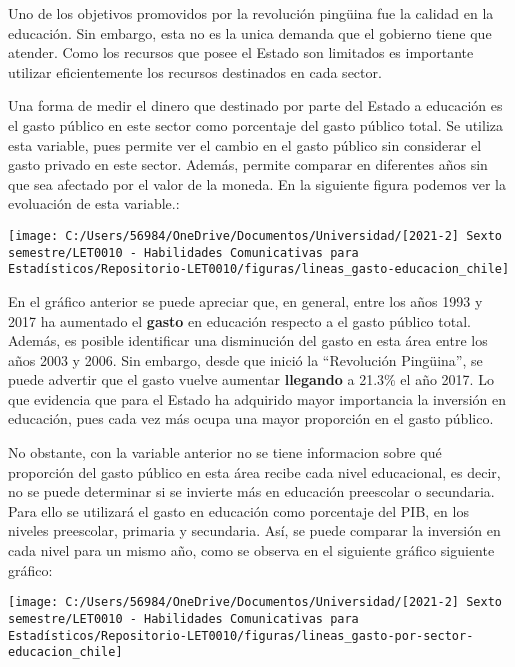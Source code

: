 \documentclass[
]{article}
\begin{document}
Uno de los objetivos promovidos por la revolución pingüina fue la
calidad en la educación. Sin embargo, esta no es la unica demanda que el
gobierno tiene que atender. Como los recursos que posee el Estado son
limitados es importante utilizar eficientemente los recursos destinados
en cada sector.

Una forma de medir el dinero que destinado por parte del Estado a
educación es el gasto público en este sector como porcentaje del gasto
público total. Se utiliza esta variable, pues permite ver el cambio en
el gasto público sin considerar el gasto privado en este sector. Además,
permite comparar en diferentes años sin que sea afectado por el valor de
la moneda. En la siguiente figura podemos ver la evoluación de esta
variable.:

\begin{center}\texttt{[image: C:/Users/56984/OneDrive/Documentos/Universidad/[2021-2] Sexto semestre/LET0010 - Habilidades Comunicativas para Estadísticos/Repositorio-LET0010/figuras/lineas\_gasto-educacion\_chile]} \end{center}

En el gráfico anterior se puede apreciar que, en general, entre los años
1993 y 2017 ha aumentado el \textbf{gasto} en educación respecto a el
gasto público total. Además, es posible identificar una disminución del
gasto en esta área entre los años 2003 y 2006. Sin embargo, desde que
inició la ``Revolución Pingüina'', se puede advertir que el gasto vuelve
aumentar \textbf{llegando} a 21.3\% el año 2017. Lo que evidencia que
para el Estado ha adquirido mayor importancia la inversión en educación,
pues cada vez más ocupa una mayor proporción en el gasto público.

No obstante, con la variable anterior no se tiene informacion sobre qué
proporción del gasto público en esta área recibe cada nivel educacional,
es decir, no se puede determinar si se invierte más en educación
preescolar o secundaria. Para ello se utilizará el gasto en educación
como porcentaje del PIB, en los niveles preescolar, primaria y
secundaria. Así, se puede comparar la inversión en cada nivel para un
mismo año, como se observa en el siguiente gráfico siguiente gráfico:

\begin{center}\texttt{[image: C:/Users/56984/OneDrive/Documentos/Universidad/[2021-2] Sexto semestre/LET0010 - Habilidades Comunicativas para Estadísticos/Repositorio-LET0010/figuras/lineas\_gasto-por-sector-educacion\_chile]} \end{center}
\end{document}
